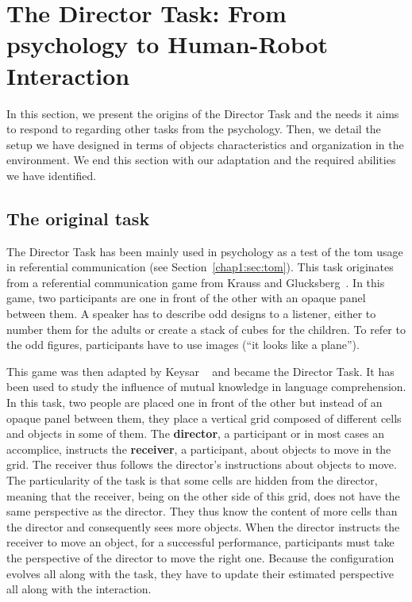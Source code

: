 \documentclass[a4paper,11pt,twoside]{StyleThese}
\begin{document}
\section{The Director Task: From psychology to Human-Robot Interaction}

In this section, we present the origins of the Director Task and the needs it aims to respond to regarding other tasks from the psychology. Then, we detail the setup we have designed in terms of objects characteristics and organization in the environment. We end this section with our adaptation and the required abilities we have identified.

\subsection{The original task}\label{chap9:subsec:psycho}

The Director Task has been mainly used in psychology as a test of the \acrfull{tom} usage in referential communication (see Section~\ref{chap1:sec:tom}). This task originates from a referential communication game from Krauss and Glucksberg~\cite{krauss_1977_social}. In this game, two participants are one in front of the other with an opaque panel between them. A speaker has to describe odd designs to a listener, either to number them for the adults or create a stack of cubes for the children. To refer to the odd figures, participants have to use images (\eg ``it looks like a plane'').

This game was then adapted by Keysar \etal~\cite{keysar_2000_taking} and became the Director Task. It has been used to study the influence of mutual knowledge in language comprehension. In this task, two people are placed one in front of the other but instead of an opaque panel between them, they place a vertical grid composed of different cells and objects in some of them. The \textbf{director}, a participant or in most cases an accomplice, instructs the \textbf{receiver}, a participant, about objects to move in the grid. The receiver thus follows the director's instructions about objects to move. The particularity of the task is that some cells are hidden from the director, meaning that the receiver, being on the other side of this grid, does not have the same perspective as the director. They thus know the content of more cells than the director and consequently sees more objects. When the director instructs the receiver to move an object, for a successful performance, participants must take the perspective of the director to move the right one. Because the configuration evolves all along with the task, they have to update their estimated perspective all along with the interaction.
\end{document}
